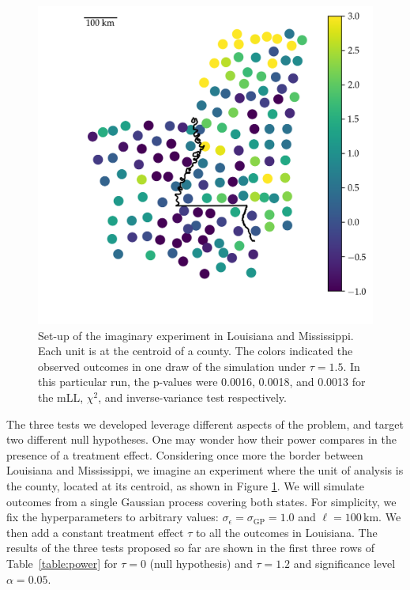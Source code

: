 \documentclass[letter]{article}
\makeatletter
\def\maxwidth{\ifdim\Gin@nat@width>\linewidth\linewidth
\else\Gin@nat@width\fi}
\let\Oldincludegraphics\includegraphics
\renewcommand{\includegraphics}[1]{\Oldincludegraphics[width=0.9\maxwidth]{#1}}
\newcommand{\sigmaf}{\sigma_{\mathrm{GP}}}
\newcommand{\sigman}{\sigma_{\epsilon}}
\makeatother
\begin{document}
    	\begin{figure}
\centering
\includegraphics{../figures/mississippi_sim.png}
\caption{\label{fig:mississippi_counties}Set-up of the imaginary experiment in Louisiana and Mississippi. Each unit is at the centroid of a county. The colors indicated the observed outcomes in one draw of the simulation under \(\tau=1.5\). In this particular run, the p-values were 0.0016, 0.0018, and 0.0013 for the mLL, \(\chi^2\), and inverse-variance test respectively.}
\end{figure}
    


    	The three tests we developed leverage different aspects of the problem, and target two different null hypotheses. One may wonder how their power compares in the presence of a treatment effect. Considering once more the border between Louisiana and Mississippi, we imagine an experiment where the unit of analysis is the county, located at its centroid, as shown in Figure \ref{fig:mississippi_counties}.
We will simulate outcomes from a single Gaussian process covering both states. For simplicity, we fix the hyperparameters to arbitrary values: \(\sigman=\sigmaf=1.0\) and \(\ell=100\,\mathrm{km}\).
We then add a constant treatment effect \(\tau\) to all the outcomes in Louisiana.
The results of the three tests proposed so far are shown in the first three rows of Table~\ref{table:power} for \(\tau=0\) (null hypothesis) and \(\tau=1.2\) and significance level \(\alpha=0.05\).
    
\end{document}
